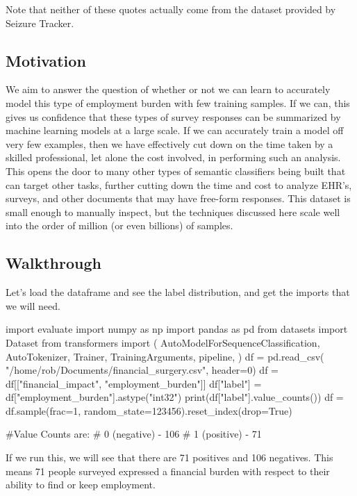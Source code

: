 Note that neither of these quotes actually come from the dataset provided by Seizure Tracker.

\subsection{Motivation}
We aim to answer the question of whether or not we can learn to accurately model this type of employment burden with few training samples. If we can, this gives us confidence that these types of survey responses
can be summarized by machine learning models at a large scale. If we can accurately train a model off very few examples, then we have effectively cut down on the time taken by a skilled professional, let alone the cost involved,
in performing such an analysis. This opens the door to many other types of semantic classifiers being built that can target other tasks, further cutting down the time and cost to analyze EHR's, surveys, and other documents that may
have free-form responses.
This dataset is small enough to manually inspect, but the techniques discussed here scale well into the order of million (or even billions) of samples.


\subsection{Walkthrough}

Let's load the dataframe and see the label distribution, and get the imports that we will need.

\begin{python}

import evaluate
import numpy as np
import pandas as pd
from datasets import Dataset
from transformers import (
    AutoModelForSequenceClassification,
    AutoTokenizer,
    Trainer,
    TrainingArguments,
    pipeline,
)
df = pd.read_csv(
    "/home/rob/Documents/financial_surgery.csv",
    header=0)
df = df[["financial_impact", "employment_burden"]]
df["label"] = df["employment_burden"].astype("int32")
print(df["label"].value_counts())
df = df.sample(frac=1,
    random_state=123456).reset_index(drop=True)

#Value Counts are:
# 0 (negative) - 106
# 1 (positive) - 71
\end{python}

If we run this, we will see that there are 71 positives and 106 negatives. This means 71 people surveyed expressed a financial burden
with respect to their ability to find or keep employment.

